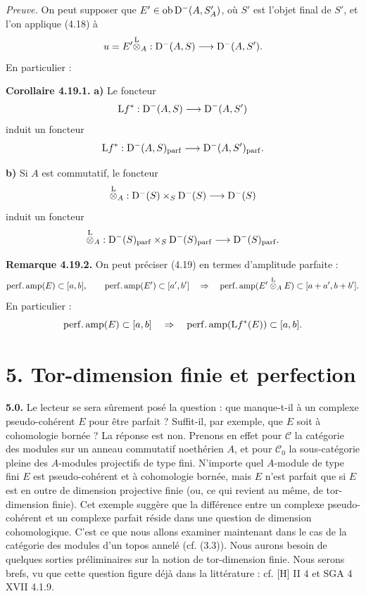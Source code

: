\documentclass[11pt]{article}
\begin{document}
\emph{Preuve.} On peut supposer que \(E'\in\operatorname{ob}\mathrm D^-(A,S'_A)\), où \(S'\) est l'objet final de \(S'\), et l'on applique (4.18) à
\[
  u=E'\overset{\mathrm L}{\otimes}_A:
  \mathrm D^-(A,S)\longrightarrow \mathrm D^-(A,S').
\]
En particulier :

\textbf{Corollaire 4.19.1.} \textbf{a)} Le foncteur
\[
  \mathrm L f^*:\mathrm D^-(A,S)\longrightarrow \mathrm D^-(A,S')
\]
induit un foncteur
\[
  \mathrm L f^*:\mathrm D^-(A,S)_{\mathrm{parf}}
  \longrightarrow
  \mathrm D^-(A,S')_{\mathrm{parf}}.
\]

\textbf{b)} Si \(A\) est commutatif, le foncteur
\[
  \overset{\mathrm L}{\otimes}_A:
  \mathrm D^-(S)\times_S\mathrm D^-(S)
  \longrightarrow \mathrm D^-(S)
\]
induit un foncteur
\[
  \overset{\mathrm L}{\otimes}_A:
  \mathrm D^-(S)_{\mathrm{parf}}\times_S\mathrm D^-(S)_{\mathrm{parf}}
  \longrightarrow \mathrm D^-(S)_{\mathrm{parf}}.
\]

\textbf{Remarque 4.19.2.} On peut préciser (4.19) en termes d'amplitude parfaite :
\[
  \operatorname{perf.amp}(E)\subset[a,b],\qquad
  \operatorname{perf.amp}(E')\subset[a',b']
  \quad\Rightarrow\quad
  \operatorname{perf.amp}(E'\overset{\mathrm L}{\otimes}_A E)\subset[a+a',b+b'].
\]
En particulier :
\[
  \operatorname{perf.amp}(E)\subset[a,b]
  \quad\Rightarrow\quad
  \operatorname{perf.amp}(\mathrm L f^*(E))\subset[a,b].
\]

\section*{5. Tor-dimension finie et perfection}

\textbf{5.0.} Le lecteur se sera sûrement posé la question : que manque-t-il à un complexe pseudo-cohérent \(E\) pour être parfait ? Suffit-il, par exemple, que \(E\) soit à cohomologie bornée ? La réponse est non. Prenons en effet pour \(\mathcal C\) la catégorie des modules sur un anneau commutatif noethérien \(A\), et pour \(\mathcal C_0\) la sous-catégorie pleine des \(A\)-modules projectifs de type fini. N'importe quel \(A\)-module de type fini \(E\) est pseudo-cohérent et à cohomologie bornée, mais \(E\) n'est parfait que si \(E\) est en outre de dimension projective finie (ou, ce qui revient au même, de tor-dimension finie). Cet exemple suggère que la différence entre un complexe pseudo-cohérent et un complexe parfait réside dans une question de dimension cohomologique. C'est ce que nous allons examiner maintenant dans le cas de la catégorie des modules d'un topos annelé (cf. (3.3)). Nous aurons besoin de quelques sorties préliminaires sur la notion de tor-dimension finie. Nous serons brefs, vu que cette question figure déjà dans la littérature : cf. [H] II 4 et SGA 4 XVII 4.1.9.
\end{document}

